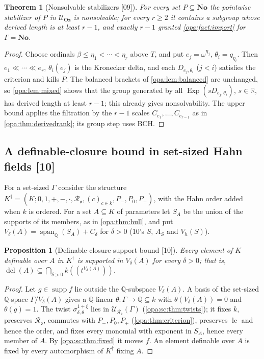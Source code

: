 \documentclass[11pt,oneside]{article}
\numberwithin{equation}{section}
\newtheorem{theorem}{Theorem}[section]
\newtheorem{proposition}[proposition]{Proposition}
\theoremstyle{definition}
\theoremstyle{remark}
\newcommand{\No}{\mathbf{No}}
\newcommand{\Oz}{\mathbf{Oz}}
\newcommand{\R}{\mathbb R}
\newcommand{\Q}{\mathbb Q}
\newcommand{\oo}{\mathfrak o}
\newcommand{\Ro}{\mathcal R_{\oo}}
\newcommand{\UU}{\mathcal U}
\newcommand{\supp}{\operatorname{supp}}
\newcommand{\lc}{\operatorname{lc}}
\newcommand{\Exp}{\operatorname{Exp}}
\newcommand{\Span}{\operatorname{span}_{\Q}}
\newcommand{\bb}{\mathbin{\ll}}
\newcommand{\Hahn}[2]{#1((t^{#2}))}
\newcommand{\src}[1]{\textup{\textsf{\small[#1]}}}
\begin{document}
\begin{theorem}[Nonsolvable stabilizers \src{09}]\label{opa:thm:nonsolvable}
For every set $P\subseteq\No$ the pointwise stabilizer of $P$ in $\UU_\Oz$ is
nonsolvable; for every $r\ge2$ it contains a subgroup whose derived length is at
least $r-1$, and exactly $r-1$ granted \cref{opa:fact:import} for $\Gamma=\No$.
\end{theorem}
\begin{proof}
Choose ordinals $\beta\le\eta_1<\cdots<\eta_r$ above $T$, and put $e_j=\omega^{\eta_j}$,
$\theta_i=q_{\eta_i}$. Then $e_1\bb\cdots\bb e_r$, $\theta_i(e_j)$ is the Kronecker
delta, and each $D_{e_j,\theta_i}$ ($j<i$) satisfies the criterion and kills
$P$. The balanced brackets of \cref{opa:lem:balanced} are unchanged, so
\cref{opa:lem:mixed} shows that the group generated by all
$\Exp(sD_{e_j,\theta_i})$, $s\in\R$, has derived length at least $r-1$; this
already gives nonsolvability. The upper bound applies the filtration by the
$r-1$ scales $C_{e_1},\dots,C_{e_{r-1}}$ as in \cref{opa:thm:derivedrank}; its
group step uses BCH.
\end{proof}

\subsection{A definable-closure bound in set-sized Hahn fields \src{10}}\label{opa:sc:sub:dcl}

For a set-sized $\Gamma$ consider the structure
$K^\dagger=(K;0,1,+,-,\cdot,\Ro,(c)_{c\in k},P_-,P_0,P_+)$, with the Hahn order
added when $k$ is ordered. For a set $A\subseteq K$ of parameters let $S_A$ be the
union of the supports of its members, as in \cref{opa:thm:hull}, and put
$V_\delta(A)=\Span(S_A)+C_\delta$ for $\delta>0$ (10's $S$, $A_S$ and $V_h(S)$).

\begin{proposition}[Definable-closure support bound \src{10}]\label{opa:sc:prop:dclset}
Every element of $K$ definable over $A$ in $K^\dagger$ is supported in $V_\delta(A)$
for every $\delta>0$; that is,
$\operatorname{dcl}(A)\subseteq\bigcap_{\delta>0}\Hahn k{V_\delta(A)}$.
\end{proposition}
\begin{proof}
Let $g\in\supp f$ lie outside the $\Q$-subspace $V_\delta(A)$. A basis of the
set-sized $\Q$-space $\Gamma/V_\delta(A)$ gives a $\Q$-linear $\theta:\Gamma\to\Q\subseteq k$
with $\theta(V_\delta(A))=0$ and $\theta(g)=1$. The twist
$\sigma^{1+\xi}_{\delta,\theta}$ lies in $\UU_{\Ro}(\Gamma)$
(\cref{opa:sc:thm:twists}); it fixes $k$, preserves $\Ro$, commutes with
$P_-,P_0,P_+$ (\cref{opa:thm:criterion}), preserves $\lc$ and hence the order,
and fixes every monomial with exponent in $S_A$, hence every member of $A$. By
\cref{opa:sc:thm:fixed} it moves $f$. An element definable over $A$ is fixed by
every automorphism of $K^\dagger$ fixing $A$.
\end{proof}
\end{document}
